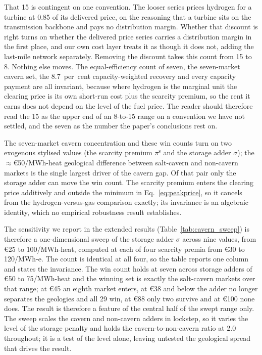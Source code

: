 That 15 is contingent on one convention. The looser series prices hydrogen
for a turbine at 0.85 of its delivered price, on the reasoning that a turbine sits on the
transmission backbone and pays no distribution margin. Whether that discount is right turns
on whether the delivered price series carries a distribution margin in the first place, and
our own cost layer treats it as though it does not, adding the last-mile network separately.
Removing the discount takes this count from 15 to 8. Nothing else moves. The equal-efficiency
count of seven, the seven-market cavern set, the 8.7~per~cent capacity-weighted recovery and
every capacity payment are all invariant, because where hydrogen is the marginal unit the
clearing price is its own short-run cost plus the scarcity premium, so the rent it earns does
not depend on the level of the fuel price. The reader should therefore read the 15 as the
upper end of an 8-to-15 range on a convention we have not settled, and the seven as the
number the paper's conclusions rest on.

The seven-market cavern concentration and these win counts turn on two exogenous stylised values (the scarcity premium
$\pi^{\mathrm{s}}$ and the storage adder $\sigma$); the $\approx$\euro{}50/MWh-heat
geological difference between salt-cavern and non-cavern markets is the single largest
driver of the cavern gap. Of that pair only the storage adder can move the win count.
The scarcity premium enters the clearing price additively and outside the minimum in
Eq.~\eqref{eq:peakprice}, so it cancels from the hydrogen-versus-gas comparison
exactly; its invariance is an algebraic identity, which no empirical robustness result establishes.

The sensitivity we report in the extended results
(Table~\ref{tab:cavern_sweep}) is therefore a one-dimensional sweep of the storage
adder $\sigma$ across nine values, from \euro{}25 to 100/MWh-heat, computed at each of
four scarcity premia from \euro{}30 to 120/MWh-e. The count is identical at all four, so
the table reports one column and states the invariance.
The win count holds at seven across storage adders of \euro{}50 to 75/MWh-heat and the
winning set is exactly the salt-cavern markets over that range; at \euro{}45 an eighth
market enters, at \euro{}38 and below the adder no longer separates the geologies and
all 29 win, at \euro{}88 only two survive and at \euro{}100 none does. The result is therefore a feature of the central half of the swept range only. The sweep scales the cavern and non-cavern adders in lockstep, so it varies the
level of the storage penalty and holds the cavern-to-non-cavern ratio at 2.0
throughout; it is a test of the level alone, leaving untested the geological spread that drives the
result.

